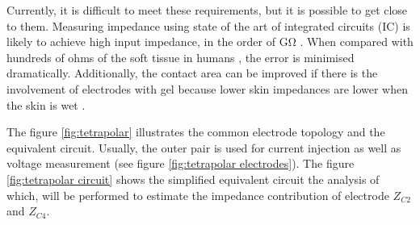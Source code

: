 Currently, it is difficult to meet these requirements, but it is possible to get close to them. Measuring impedance using state of the art of integrated circuits (IC) is likely to achieve high input impedance, in the order of \si{\giga\ohm} \cite{ad:AD8421}. When compared with hundreds of ohms of the soft tissue in humans \cite{faes1999electric, grimnes1983impedance}, the error is minimised dramatically. Additionally, the contact area can be improved if there is the involvement of electrodes with gel because lower skin impedances are lower when the skin is wet \cite{grimnes1983impedance, mcadams1996factors}.

The figure \ref{fig:tetrapolar} illustrates the common electrode topology and the equivalent circuit. Usually, the outer pair is used for current injection as well as voltage measurement (see figure \ref{fig:tetrapolar electrodes}). The figure \ref{fig:tetrapolar circuit} shows the simplified equivalent circuit the analysis of which, will be performed to estimate the impedance contribution of electrode $Z_{C2}$ and $Z_{C4}$. 

